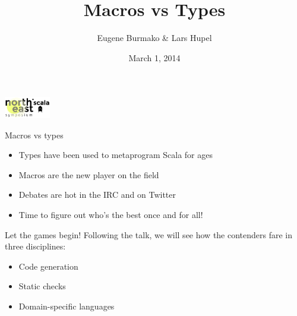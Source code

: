 \documentclass{beamer}
\begin{document}
  \title{Macros vs Types}
  \author{Eugene Burmako \& Lars Hupel}
  \date{March 1, 2014}

{
\begin{frame}
  \titlepage

  \begin{center}
    \includegraphics[width=2cm]{img/nescala-logo.png}
  \end{center}
\end{frame}
}

\begin{frame}{Macros vs types}
  \begin{itemize}
    \item Types have been used to metaprogram Scala for ages
    \item Macros are the new player on the field
    \item Debates are hot in the IRC and on Twitter
    \item Time to figure out who's the best once and for all!
  \end{itemize}
\end{frame}

\begin{frame}{Let the games begin!}
  Following the  talk, we will see how the contenders fare in three disciplines:

  \vspace{1em}
  \begin{itemize}
    \item Code generation
    \item Static checks
    \item Domain-specific languages
  \end{itemize}
\end{frame}

\end{document}
